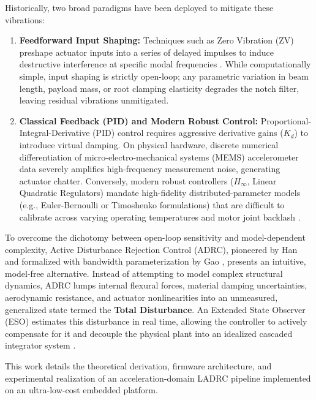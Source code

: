\documentclass[conference]{IEEEtran}
\begin{document}
Historically, two broad paradigms have been deployed to mitigate these vibrations:
\begin{enumerate}
    \item \textbf{Feedforward Input Shaping:} Techniques such as Zero Vibration (ZV) preshape actuator inputs into a series of delayed impulses to induce destructive interference at specific modal frequencies \cite{singer1990preshaping}. While computationally simple, input shaping is strictly open-loop; any parametric variation in beam length, payload mass, or root clamping elasticity degrades the notch filter, leaving residual vibrations unmitigated.
    \item \textbf{Classical Feedback (PID) and Modern Robust Control:} Proportional-Integral-Derivative (PID) control requires aggressive derivative gains ($K_d$) to introduce virtual damping. On physical hardware, discrete numerical differentiation of micro-electro-mechanical systems (MEMS) accelerometer data severely amplifies high-frequency measurement noise, generating actuator chatter. Conversely, modern robust controllers ($H_\infty$, Linear Quadratic Regulators) mandate high-fidelity distributed-parameter models (e.g., Euler-Bernoulli or Timoshenko formulations) that are difficult to calibrate across varying operating temperatures and motor joint backlash \cite{ge1998model}.
\end{enumerate}

To overcome the dichotomy between open-loop sensitivity and model-dependent complexity, Active Disturbance Rejection Control (ADRC), pioneered by Han \cite{han2009pid} and formalized with bandwidth parameterization by Gao \cite{gao2003scaling}, presents an intuitive, model-free alternative. Instead of attempting to model complex structural dynamics, ADRC lumps internal flexural forces, material damping uncertainties, aerodynamic resistance, and actuator nonlinearities into an unmeasured, generalized state termed the \textbf{Total Disturbance}. An Extended State Observer (ESO) estimates this disturbance in real time, allowing the controller to actively compensate for it and decouple the physical plant into an idealized cascaded integrator system \cite{zheng2012active, madonski2019active}.

This work details the theoretical derivation, firmware architecture, and experimental realization of an acceleration-domain LADRC pipeline implemented on an ultra-low-cost embedded platform.
\end{document}
